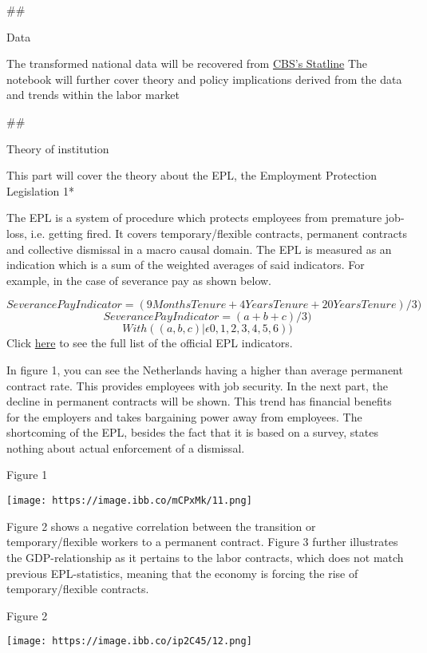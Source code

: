 \documentclass[11pt]{article}
\makeatletter
\def\maxwidth{\ifdim\Gin@nat@width>\linewidth\linewidth
    \else\Gin@nat@width\fi}
\let\Oldincludegraphics\includegraphics
\renewcommand{\includegraphics}[1]{\Oldincludegraphics[width=.8\maxwidth]{#1}}
\makeatother
\begin{document}
    \#\#

{Data}

The transformed national data will be recovered from
\href{http://statline.cbs.nl/StatWeb/publication/?VW=T\&DM=SLNL\&PA=70072ned\&D1=0-118\&D2=0,12\&D3=14-15\&HD=100914-1525\&HDR=T\&STB=G1,G2}{CBS's
Statline} The notebook will further cover theory and policy implications
derived from the data and trends within the labor market

    \#\#

{Theory of institution}

This part will cover the theory about the EPL, the Employment Protection
Legislation 1*

The EPL is a system of procedure which protects employees from premature
job-loss, i.e. getting fired. It covers temporary/flexible contracts,
permanent contracts and collective dismissal in a macro causal domain.
The EPL is measured as an indication which is a sum of the weighted
averages of said indicators. For example, in the case of severance pay
as shown below.

    \[Severance Pay Indicator = {(9Months Tenure + 4Years Tenure + 20Years Tenure)/3)}\]
\[Severance Pay Indicator = {(a + b + c)/3)}\]
\[{With ((a,b,c)| ϵ  0,1,2,3,4,5,6))}\] Click
\href{https://www.oecd.org/els/emp/EPL-Document-LAC-Methodology-ENG.pdf}{here}
to see the full list of the official EPL indicators.

    In figure 1, you can see the Netherlands having a higher than average
permanent contract rate. This provides employees with job security. In
the next part, the decline in permanent contracts will be shown. This
trend has financial benefits for the employers and takes bargaining
power away from employees. The shortcoming of the EPL, besides the fact
that it is based on a survey, states nothing about actual enforcement of
a dismissal.

    {Figure 1}

\texttt{[image: https://image.ibb.co/mCPxMk/11.png]}

    Figure 2 shows a negative correlation between the transition or
temporary/flexible workers to a permanent contract. Figure 3 further
illustrates the GDP-relationship as it pertains to the labor contracts,
which does not match previous EPL-statistics, meaning that the economy
is forcing the rise of temporary/flexible contracts.

    {Figure 2}

\texttt{[image: https://image.ibb.co/ip2C45/12.png]}
\end{document}

